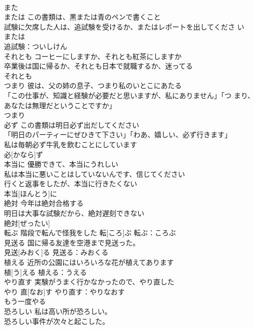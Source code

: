 \documentclass[8pt]{extreport}
\begin{document}
\begin{CJK}{UTF8}{min}
\\	また			
\\	または	この書類は、黒または青のペンで書くこと 
\\	試験に欠席した人は、追試験を受けるか、またはレポートを出してくださ い 
\\	または			
\\	追試験：ついしけん
\\	それとも	コーヒーにしますか、それとも紅茶にしますか 
\\	卒業後は国に帰るか、それとも日本で就職するか、迷ってる 
\\	それとも			
\\	つまり	彼は、父の姉の息子、つまり私のいとこにあたる 
\\	「この仕事が、知識と経験が必要だと思いますが、私にありません」「つ まり、あなたは無理だということですか」 
\\	つまり			
\\	必ず	この書類は明日必ず出だしてください 
\\	「明日のパーティーにぜひきて下さい」「わあ、嬉しい、必ず行きます」 
\\	私は毎朝必ず牛乳を飲むことにしています 
\\	必[かなら]ず			
\\	本当に	優勝できて、本当にうれしい 
\\	私は本当に悪いことはしていないんです、信じてください 
\\	行くと返事をしたが、本当に行きたくない 
\\	本当[ほんとう]に						
\\	絶対	今年は絶対合格する 
\\	明日は大事な試験だから、絶対遅刻できない 
\\	絶対[ぜったい]						
\\	転ぶ	階段で転んで怪我をした	転[ころ]ぶ			転ぶ：ころぶ
\\	見送る	国に帰る友達を空港まで見送った。 
\\	見送[みおく]る			見送る：みおくる
\\	植える	近所の公園にはいろいろな花が植えてあります 
\\	植[う]える			植える：うえる
\\	やり直す	実験がうまく行かなかったので、やり直した 
\\	やり 直[なお]す			やり直す：やりなおす
\\	もう一度やる			
\\	恐ろしい	私は高い所が恐ろしい。 
\\	恐ろしい事件が次々と起こした。 

\end{CJK}
\end{document}
